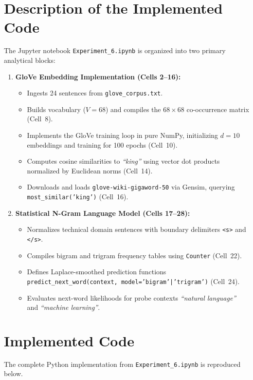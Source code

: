 \section{Description of the Implemented Code}
The Jupyter notebook \texttt{Experiment\_6.ipynb} is organized into two primary analytical blocks:
\begin{enumerate}
    \item \textbf{GloVe Embedding Implementation (Cells 2--16):}
    \begin{itemize}
        \item Ingests 24 sentences from \texttt{glove\_corpus.txt}.
        \item Builds vocabulary ($V=68$) and compiles the $68 \times 68$ co-occurrence matrix (Cell~8).
        \item Implements the GloVe training loop in pure NumPy, initializing $d=10$ embeddings and training for 100 epochs (Cell~10).
        \item Computes cosine similarities to \textit{``king''} using vector dot products normalized by Euclidean norms (Cell~14).
        \item Downloads and loads \texttt{glove-wiki-gigaword-50} via Gensim, querying \texttt{most\_similar('king')} (Cell~16).
    \end{itemize}
    \item \textbf{Statistical N-Gram Language Model (Cells 17--28):}
    \begin{itemize}
        \item Normalizes technical domain sentences with boundary delimiters \texttt{<s>} and \texttt{</s>}.
        \item Compiles bigram and trigram frequency tables using \texttt{Counter} (Cell~22).
        \item Defines Laplace-smoothed prediction functions \texttt{predict\_next\_word(context, model='bigram'|'trigram')} (Cell~24).
        \item Evaluates next-word likelihoods for probe contexts \textit{``natural language''} and \textit{``machine learning''}.
    \end{itemize}
\end{enumerate}

\section{Implemented Code}
The complete Python implementation from \texttt{Experiment\_6.ipynb} is reproduced below.

